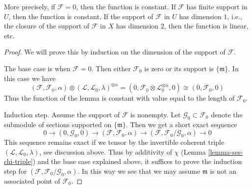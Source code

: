 \documentclass[10pt,a4paper]{amsart}
\theoremstyle{plain}
\theoremstyle{definition}
\theoremstyle{remark}
\numberwithin{equation}{subsection}
\begin{document}
\noindent
More precisely, if $\mathcal{F} = 0$, then the function is constant.
If $\mathcal{F}$ has finite support in $U$, then the function is constant.
If the support of $\mathcal{F}$ in $U$ has dimension $1$, i.e., the
closure of the support of $\mathcal{F}$ in $X$ has dimension $2$, then
the function is linear, etc.

\begin{proof}
We will prove this by induction on the dimension of the support of
$\mathcal{F}$.

\medskip\noindent
The base case is when $\mathcal{F} = 0$. Then either
$\mathcal{F}_0$ is zero or its support is $\{\mathfrak m\}$.
In this case we have
$$
(\mathcal{F}, \mathcal{F}_0, \alpha) \otimes
(\mathcal{L}, \mathcal{L}_0, \lambda)^{\otimes n} =
(0, \mathcal{F}_0 \otimes \mathcal{L}_0^{\otimes n}, 0) \cong
(0, \mathcal{F}_0, 0)
$$
Thus the function of the lemma is constant with value equal
to the length of $\mathcal{F}_0$.

\medskip\noindent
Induction step. Assume the support of $\mathcal{F}$ is nonempty.
Let $\mathcal{G}_0 \subset \mathcal{F}_0$ denote the submodule
of sections supported on $\{\mathfrak m\}$. Then we get a short
exact sequence
$$
0 \to (0, \mathcal{G}_0, 0) \to
(\mathcal{F}, \mathcal{F}_0, \alpha) \to
(\mathcal{F}, \mathcal{F}_0/\mathcal{G}_0, \alpha) \to 0
$$
This sequence remains exact if we tensor by the invertible
coherent triple $(\mathcal{L}, \mathcal{L}_0, \lambda)$, see
discussion above. Thus by additivity of $\chi$
(Lemma \ref{lemma-ses-chi-triple})
and the base case explained above, it suffices to prove
the induction step for
$(\mathcal{F}, \mathcal{F}_0/\mathcal{G}_0, \alpha)$.
In this way we see that we may assume $\mathfrak m$ is not
an associated point of $\mathcal{F}_0$.


\end{proof}
\end{document}
